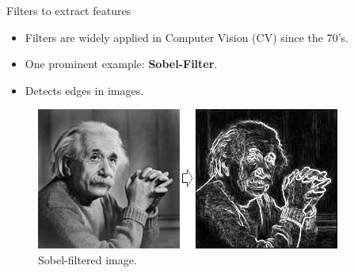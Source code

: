 







\begin{vbframe}{Filters to extract features}
    \begin{itemize}
        \item Filters are widely applied in Computer Vision (CV) since the 70's.
        \item One prominent example: \textbf{Sobel-Filter}.
        \item Detects edges in images.
    \end{itemize}
    \begin{figure}
        \centering
        \includegraphics[width=10cm]{figure/sobel_einstein.png}
        \caption{Sobel-filtered image.}
    \end{figure}
\framebreak


\end{vbframe}
